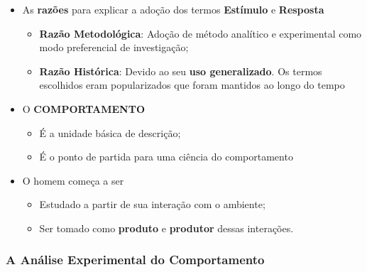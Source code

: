 \documentclass[
]{book}
\providecommand{\tightlist}{%
  \setlength{\itemsep}{0pt}\setlength{\parskip}{0pt}}
\begin{document}
\begin{itemize}
\tightlist
\item
  As \textbf{razões} para explicar a adoção dos termos \textbf{Estímulo} e \textbf{Resposta}

  \begin{itemize}
  \tightlist
  \item
    \textbf{Razão Metodológica}: Adoção de método analítico e experimental como modo preferencial de investigação;
  \item
    \textbf{Razão Histórica}: Devido ao seu \textbf{uso generalizado}. Os termos escolhidos eram popularizados que foram mantidos ao longo do tempo
  \end{itemize}
\item
  O \textbf{COMPORTAMENTO}

  \begin{itemize}
  \tightlist
  \item
    É a unidade básica de descrição;
  \item
    É o ponto de partida para uma ciência do comportamento
  \end{itemize}
\item
  O homem começa a ser

  \begin{itemize}
  \tightlist
  \item
    Estudado a partir de sua interação com o ambiente;
  \item
    Ser tomado como \textbf{produto} e \textbf{produtor} dessas interações.
  \end{itemize}
\end{itemize}

\hypertarget{a-anuxe1lise-experimental-do-comportamento}{%
\subsubsection{A Análise Experimental do Comportamento}\label{a-anuxe1lise-experimental-do-comportamento}}
\end{document}
